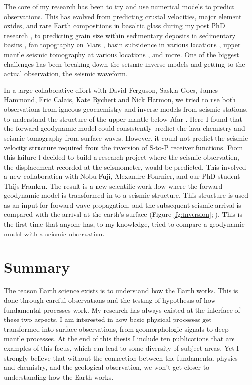 The core of my research has been to try and use numerical models to predict observations. This has evolved from predicting crustal velocities, major element oxides, and rare Earth compositions in basaltic glass during my post PhD research \citep{armitage-etal-2010,armitage-etal-g3-2011}, to predicting grain size within sedimentary deposits in sedimentary basins \citep[e.g.][]{armitage-etal-ngeo-2011,armitage-etal-2015,armitage-etal-br-2018}, fan topography on Mars \citep{armitage-etal-grl-2011}, basin subsidence in various locations \citep[e.g.][]{armitage-2010,armitage-etal-jgr-2013,petersen-etal-2015}, upper mantle seismic tomography at various locations \citep[e.g.][]{goes-etal-2012,armitage-etal-2015}, and more. One of the biggest challenges has been breaking down the seismic inverse models and getting to the actual observation, the seismic waveform.

In a large collaborative effort with David Ferguson, Saskia Goes, James Hammond, Eric Calais, Kate Rychert and Nick Harmon, we tried to use both observations from igneous geochemistry and inverse models from seismic stations, to understand the structure of the upper mantle below Afar \citep{armitage-etal-epsl-2015}. Here I found that the forward geodynamic model could consistently predict the lava chemistry and seismic tomography from surface waves. However, it could not predict the seismic velocity structure required from the inversion of S-to-P receiver functions. From this failure I decided to build a research project where the seismic observation, the displacement recorded at the seismometer, would be predicted. This involved a new collaboration with Nobu Fuji, Alexandre Fournier, and our PhD student Thijs Franken. The result is a new scientific work-flow where the forward geodynamic model is transformed in to a seismic structure. This structure is used as an input for forward wave propagation, and the subsequent seismic arrival is compared with the arrival at the earth's surface (Figure \ref{fg:inversion}; \citealp{franken-etal-2020}). This is the first time that anyone has, to my knowledge, tried to compare a geodynamic model with a seismic observation.

\section{Summary}

The reason Earth science exists is to understand how the Earth works. This is done through careful observations and the testing of hypothesis of how fundamental processes work. My research has always existed at the interface of these two aspects. I am interested in how basic physical processes get transformed into surface observations, from geomorphologic signals to deep mantle processes. At the end of this thesis I include ten publications that are examples of this focus, which can lead to some diversity of subject areas. Yet I strongly believe that without the connection between the fundamental physics and chemistry, and the geological observation, we won't get closer to understanding how the Earth works. 
